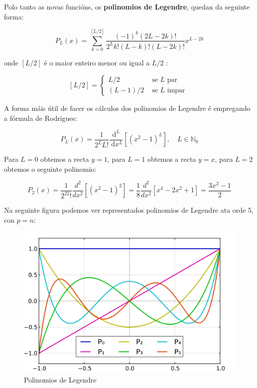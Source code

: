 \documentclass[a4paper,12pt,titlepage]{article}
\begin{document}
Polo tanto as novas funcións, os \textbf{polinomios de Legendre}, quedan da seguinte forma:

\begin{equation*}
    P_{L}(x)=\sum_{k=0}^{[L / 2]} \frac{(-1)^{k}(2 L-2 k) !}{2^{L} k !(L-k) !(L-2 k) !} x^{L-2 k}
\end{equation*}

onde $[L / 2]$ é o maior enteiro menor ou igual a $L / 2$ :

$$
[L / 2]= \begin{cases}L / 2 & \text { se } L \text { par } \\ (L-1) / 2 & \text { se } L \text { impar }\end{cases}
$$  

A forma máis útil de facer os cálculos dos polinomios de Legendre é empregando a fórmula de Rodrigues:

\begin{equation*}
    P_{L}(x)=\frac{1}{2^{L} L !} \frac{\mathrm{d}^{L}}{\mathrm{~d} x^{L}}\left[\left(x^{2}-1\right)^{L}\right], \quad L \in \mathbb{N}_{0}
\end{equation*}

Para $L=0$ obtemos a recta $y=1$, para $L=1$ obtemos a recta $y=x$, para $L=2$ obtemos o seguinte polinomio:

\begin{equation*}
    P_2(x) = \frac{1}{2^22!} \frac{d^2}{dx^2}[(x^2-1)^2] = \frac{1}{8} \frac{d^2}{dx^2}[x^4-2x^2+1] = \frac{3x^2-1}{2}
\end{equation*}


\par Na seguinte figura podemos ver representados polinomios de Legendre ata orde 5, con $p=n$:

\begin{figure}[h!]
    \centering
    \includegraphics[width=0.8\linewidth]{Images/legendre.png}
    \caption{Polinomios de Legendre}
\end{figure}
\end{document}
